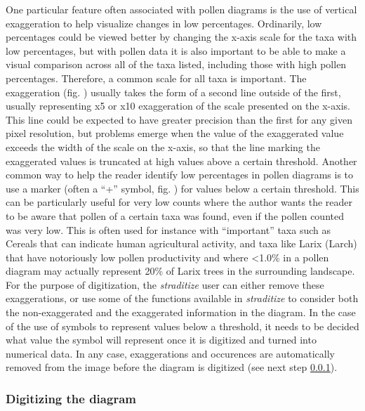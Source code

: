 \begin{refsection}
One particular feature often associated with pollen diagrams is the use of vertical exaggeration to help visualize changes in low percentages. Ordinarily, low percentages could be viewed better by changing the x-axis scale for the taxa with low percentages, but with pollen data it is also important to be able to make a visual comparison across all of the taxa listed, including those with high pollen percentages. Therefore, a common scale for all taxa is important. The exaggeration (fig. \samplediagram[j]) usually takes the form of a second line outside of the first, usually representing x5 or x10 exaggeration of the scale presented on the x-axis. This line could be expected to have greater precision than the first for any given pixel resolution, but problems emerge when the value of the exaggerated value exceeds the width of the scale on the x-axis, so that the line marking the exaggerated values is truncated at high values above a certain threshold. 
Another common way to help the reader identify low percentages in pollen diagrams is to use a marker (often a \enquote{+} symbol, fig. \samplediagram[k]) for values below a certain threshold. This can be particularly useful for very low counts where the author wants the reader to be aware that pollen of a certain taxa was found, even if the pollen counted was very low. This is often used for instance with \enquote{important} taxa such as Cereals that can indicate human agricultural activity, and taxa like Larix (Larch) that have notoriously low pollen productivity and where <1.0\% in a pollen diagram may actually represent 20\% of Larix trees in the surrounding landscape. 
For the purpose of digitization, the \emph{straditize} user can either remove these exaggerations, or use some of the functions available in \emph{straditize} to consider both the non-exaggerated and the exaggerated information in the diagram. In the case of the use of symbols to represent values below a threshold, it needs to be decided what value the symbol will represent once it is digitized and turned into numerical data.  In any case, exaggerations and occurences are automatically removed from the image before the diagram is digitized (see next step \ref{sec:straditize-digitize}).

\subsubsection{Digitizing the diagram}  \label{sec:straditize-digitize}


\end{refsection}
